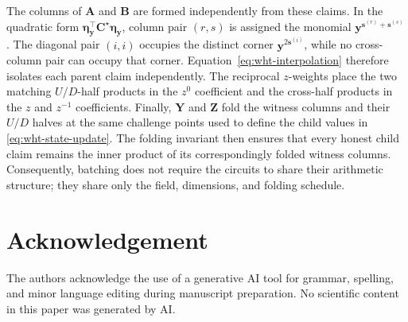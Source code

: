 \documentclass[runningheads]{llncs}
\begin{document}
The columns of \(\bm A\) and \(\bm B\) are formed independently from
these claims.  In the quadratic form
\(\bm\eta_{\bm y}^\top\bm C^\star\bm\eta_{\bm y}\), column pair
\((r,s)\) is assigned the monomial
\(\bm y^{\bm s^{(r)}+\bm s^{(s)}}\).  The diagonal pair \((i,i)\)
occupies the distinct corner \(\bm y^{2\bm s^{(i)}}\), while no
cross-column pair can occupy that corner.
Equation~\eqref{eq:wht-interpolation} therefore isolates each parent
claim independently.  The reciprocal \(z\)-weights place the two
matching \(U/D\)-half products in the \(z^0\) coefficient and the
cross-half products in the \(z\) and \(z^{-1}\) coefficients.
Finally, \(\bm Y\) and \(\bm Z\) fold the witness columns and their
\(U/D\) halves at the same challenge points used to define the child
values in \eqref{eq:wht-state-update}.  The folding invariant then
ensures that every honest child claim remains the inner product of its
correspondingly folded witness columns.
Consequently, batching does not require the circuits to share their
arithmetic structure; they share only the field, dimensions, and
folding schedule.



\clearpage

\section*{Acknowledgement}
The authors acknowledge the use of a generative AI tool for grammar, spelling, and minor language editing during manuscript preparation. No scientific content in this paper was generated by AI.




\appendix


\end{document}
